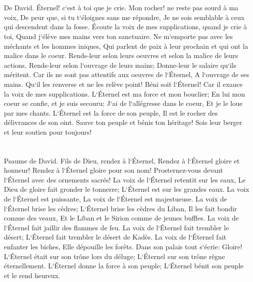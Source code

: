 \chapter{}

\verse De David. Éternel! c`est à toi que je crie. Mon rocher! ne reste pas sourd à ma voix, De peur que, si tu t`éloignes sans me répondre, Je ne sois semblable à ceux qui descendent dans la fosse. 
\verse Écoute la voix de mes supplications, quand je crie à toi, Quand j`élève mes mains vers ton sanctuaire. 
\verse Ne m`emporte pas avec les méchants et les hommes iniques, Qui parlent de paix à leur prochain et qui ont la malice dans le coeur. 
\verse Rends-leur selon leurs oeuvres et selon la malice de leurs actions, Rends-leur selon l`ouvrage de leurs mains; Donne-leur le salaire qu`ils méritent. 
\verse Car ils ne sont pas attentifs aux oeuvres de l`Éternel, A l`ouvrage de ses mains. Qu`il les renverse et ne les relève point! 
\verse Béni soit l`Éternel! Car il exauce la voix de mes supplications. 
\verse L`Éternel est ma force et mon bouclier; En lui mon coeur se confie, et je suis secouru; J`ai de l`allégresse dans le coeur, Et je le loue par mes chants. 
\verse L`Éternel est la force de son peuple, Il est le rocher des délivrances de son oint. 
\verse Sauve ton peuple et bénis ton héritage! Sois leur berger et leur soutien pour toujours! 

\chapter{}

\verse Psaume de David. Fils de Dieu, rendez à l`Éternel, Rendez à l`Éternel gloire et honneur! 
\verse Rendez à l`Éternel gloire pour son nom! Prosternez-vous devant l`Éternel avec des ornements sacrés! 
\verse La voix de l`Éternel retentit sur les eaux, Le Dieu de gloire fait gronder le tonnerre; L`Éternel est sur les grandes eaux. 
\verse La voix de l`Éternel est puissante, La voix de l`Éternel est majestueuse. 
\verse La voix de l`Éternel brise les cèdres; L`Éternel brise les cèdres du Liban, 
\verse Il les fait bondir comme des veaux, Et le Liban et le Sirion comme de jeunes buffles. 
\verse La voix de l`Éternel fait jaillir des flammes de feu. 
\verse La voix de l`Éternel fait trembler le désert; L`Éternel fait trembler le désert de Kadès. 
\verse La voix de l`Éternel fait enfanter les biches, Elle dépouille les forêts. Dans son palais tout s`écrie: Gloire! 
\verse L`Éternel était sur son trône lors du déluge; L`Éternel sur son trône règne éternellement. 
\verse L`Éternel donne la force à son peuple; L`Éternel bénit son peuple et le rend heureux. 

